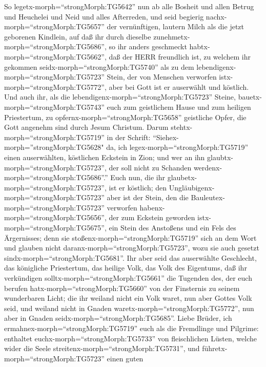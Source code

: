  So legetx-morph=``strongMorph:TG5642'' nun ab alle Bosheit
und allen Betrug und Heuchelei und Neid und alles Afterreden,
 und seid begierig nachx-morph=``strongMorph:TG5657'' der
vernünftigen, lautern Milch als die jetzt geborenen Kindlein, auf daß
ihr durch dieselbe zunehmetx-morph=``strongMorph:TG5686'', 
so ihr anders geschmeckt habtx-morph=``strongMorph:TG5662'', daß der
HERR freundlich ist,  zu welchem ihr gekommen
seidx-morph=``strongMorph:TG5740'' als zu dem
lebendigenx-morph=``strongMorph:TG5723'' Stein, der von Menschen
verworfen istx-morph=``strongMorph:TG5772'', aber bei Gott ist er
auserwählt und köstlich.  Und auch ihr, als die
lebendigenx-morph=``strongMorph:TG5723'' Steine,
bauetx-morph=``strongMorph:TG5743'' euch zum geistlichem Hause und zum
heiligen Priestertum, zu opfernx-morph=``strongMorph:TG5658'' geistliche
Opfer, die Gott angenehm sind durch Jesum Christum.  Darum
stehtx-morph=``strongMorph:TG5719'' in der Schrift:
``Siehex-morph=''strongMorph:TG5628" da, ich
legex-morph=``strongMorph:TG5719'' einen auserwählten, köstlichen
Eckstein in Zion; und wer an ihn glaubtx-morph=``strongMorph:TG5723'',
der soll nicht zu Schanden werdenx-morph=``strongMorph:TG5686''.''
 Euch nun, die ihr glaubetx-morph=``strongMorph:TG5723'',
ist er köstlich; den Ungläubigenx-morph=``strongMorph:TG5723'' aber ist
der Stein, den die Bauleutex-morph=``strongMorph:TG5723'' verworfen
habenx-morph=``strongMorph:TG5656'', der zum Eckstein geworden
istx-morph=``strongMorph:TG5675'',  ein Stein des Anstoßens
und ein Fels des Ärgernisses; denn sie
stoßenx-morph=``strongMorph:TG5719'' sich an dem Wort und glauben nicht
daranx-morph=``strongMorph:TG5723'', wozu sie auch gesetzt
sindx-morph=``strongMorph:TG5681''.  Ihr aber seid das
auserwählte Geschlecht, das königliche Priestertum, das heilige Volk,
das Volk des Eigentums, daß ihr verkündigen
solltx-morph=``strongMorph:TG5661'' die Tugenden des, der euch berufen
hatx-morph=``strongMorph:TG5660'' von der Finsternis zu seinem
wunderbaren Licht;  die ihr weiland nicht ein Volk waret,
nun aber Gottes Volk seid, und weiland nicht in Gnaden
waretx-morph=``strongMorph:TG5772'', nun aber in Gnaden
seidx-morph=``strongMorph:TG5685''.  Liebe Brüder, ich
ermahnex-morph=``strongMorph:TG5719'' euch als die Fremdlinge und
Pilgrime: enthaltet euchx-morph=``strongMorph:TG5733'' von fleischlichen
Lüsten, welche wider die Seele streitenx-morph=``strongMorph:TG5731'',
 und führetx-morph=``strongMorph:TG5723'' einen guten
